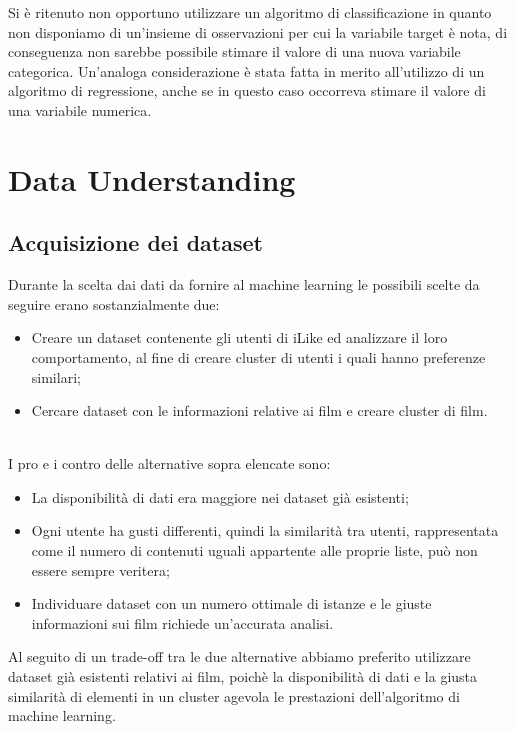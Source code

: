 \documentclass[a4paper, 10pt]{report}
\begin{document}
            Si è ritenuto non opportuno utilizzare un algoritmo di classificazione in quanto non disponiamo di un'insieme di osservazioni per cui
            la variabile target è nota, di conseguenza non sarebbe possibile stimare il valore di una nuova variabile categorica.
            Un'analoga considerazione è stata fatta in merito all'utilizzo di un algoritmo di regressione, anche se in questo caso occorreva
            stimare il valore di una variabile numerica.


    \chapter{Data Understanding}\label{ch:data-understanding}

        \section{Acquisizione dei dataset}\label{sec:acquisizione-dei-dataset}
            Durante la scelta dai dati da fornire al machine learning le possibili scelte da seguire erano sostanzialmente due:
            \begin{itemize}
                \item Creare un dataset contenente gli utenti di iLike ed analizzare il loro comportamento, al fine di creare
                cluster di utenti i quali hanno preferenze similari;
                \item Cercare dataset con le informazioni relative ai film e creare cluster di film.
            \end{itemize}

            \\I pro e i contro delle alternative sopra elencate sono:
            \begin{itemize}
                \item La disponibilità di dati era maggiore nei dataset già esistenti;
                \item Ogni utente ha gusti differenti, quindi la similarità tra utenti, rappresentata come il numero di contenuti uguali
                appartente alle proprie liste, può non essere sempre veritera;
                \item Individuare dataset con un numero ottimale di istanze e le giuste informazioni sui film richiede
                un'accurata analisi.
            \end{itemize}
            Al seguito di un trade-off tra le due alternative abbiamo preferito utilizzare dataset già esistenti relativi ai film,
            poichè la disponibilità di dati e la giusta similarità di elementi in un cluster agevola le prestazioni dell'algoritmo
            di machine learning.
\end{document}
